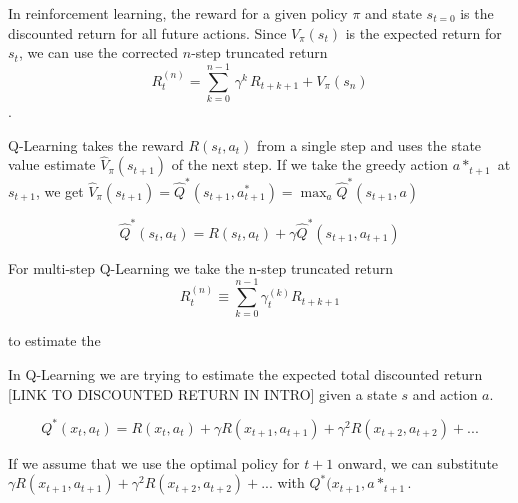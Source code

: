 In reinforcement learning, the reward for a given policy $\pi$ and state $s_{t=0}$ is the discounted return for all future actions. Since $V_\pi(s_t)$ is the expected return for $s_{t}$, we can use the corrected $n$-step truncated return 
\begin{equation}
R_t^{(n)}=\sum^{n-1}_{k=0}\,\gamma^k\,R_{t+k+1} + V_\pi(s_n)
\end{equation}.

Q-Learning takes the reward $R(s_t, a_t)$ from a single step and uses the state value estimate $\hat{V}_\pi(s_{t+1})$ of the next step. If we take the greedy action $a*_{t+1}$ at $s_{t+1}$, we get $\hat{V}_\pi(s_{t+1})=\hat{Q}^{*}(s_{t+1}, a^{*}_{t+1})=\max_a\hat{Q}^{*}(s_{t+1}, a)$

$$\hat{Q}^{*}(s_t, a_t)=R(s_t, a_t)+\gamma \hat{Q}^{*}(s_{t+1}, a_{t+1})$$

For multi-step Q-Learning we take the n-step truncated return
$$R_{t}^{(n)} \equiv \sum_{k=0}^{n-1} \gamma_{t}^{(k)} R_{t+k+1}$$

to estimate the







In Q-Learning we are trying to estimate the expected total discounted return [LINK TO DISCOUNTED RETURN IN INTRO] given a state $s$ and action $a$.

$$Q^{*}(x_t, a_t)=R(x_t, a_t)+\gamma R(x_{t+1}, a_{t+1})+\gamma^2 R(x_{t+2}, a_{t+2}) + ...$$

If we assume that we use the optimal policy for $t+1$ onward, we can substitute $\gamma R(x_{t+1}, a_{t+1})+\gamma^2 R(x_{t+2}, a_{t+2}) + ...$ with $Q^{*}(x_{t+1}, a*_{t+1}$.
